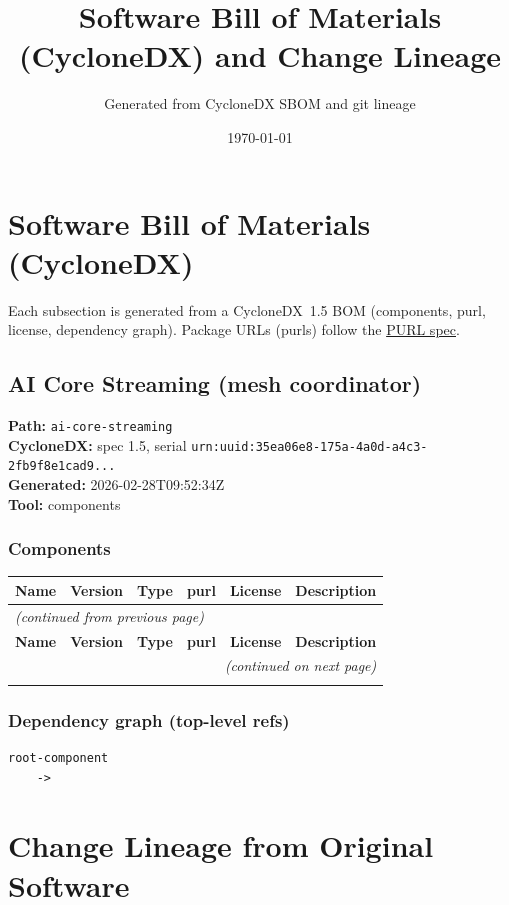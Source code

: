 \documentclass[11pt,a4paper]{article}
\title{\textbf{Software Bill of Materials (CycloneDX) and Change Lineage}}
\author{Generated from CycloneDX SBOM and git lineage}
\date{\today}
\begin{document}
\maketitle
\tableofcontents
\newpage
\section{Software Bill of Materials (CycloneDX)}
Each subsection is generated from a CycloneDX~1.5 BOM (components, purl, license, dependency graph). Package URLs (purls) follow the \href{https://github.com/package-url/purl-spec}{PURL spec}.

\subsection{AI Core Streaming (mesh coordinator)}
\textbf{Path:} \texttt{ai-core-streaming}
\\ \textbf{CycloneDX:} spec 1.5, serial \texttt{urn:uuid:35ea06e8-175a-4a0d-a4c3-2fb9f8e1cad9...}
\\ \textbf{Generated:} 2026-02-28T09:52:34Z
\\ \textbf{Tool:} components

\subsubsection*{Components}
\begin{longtable}{|p{4cm}|p{2cm}|p{1.6cm}|p{5cm}|p{1.5cm}|p{3.5cm}|}
\toprule
\rowcolor{sbomhdr}\textbf{Name} & \textbf{Version} & \textbf{Type} & \textbf{purl} & \textbf{License} & \textbf{Description} \\
\midrule
\endfirsthead
\multicolumn{6}{l}{\small\itshape (continued from previous page)} \\
\toprule
\rowcolor{sbomhdr}\textbf{Name} & \textbf{Version} & \textbf{Type} & \textbf{purl} & \textbf{License} & \textbf{Description} \\
\midrule
\endhead
\midrule
\multicolumn{6}{r}{\small\itshape (continued on next page)} \\
\endfoot
\bottomrule
\endlastfoot
\end{longtable}

\subsubsection*{Dependency graph (top-level refs)}
\begin{lstlisting}[style=depgraph]
  root-component
    -> 
\end{lstlisting}

\newpage
\section{Change Lineage from Original Software}
\end{document}
